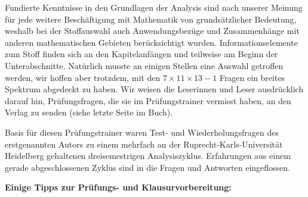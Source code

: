 Fundierte Kenntnisse in den Grundlagen der Analysis sind nach unserer 
Meinung für jede weitere Beschäftigung mit Mathematik von grundsätzlicher 
Bedeutung, weshalb bei der Stoffauswahl auch Anwendungsbezüge und 
Zusammenhänge mit anderen mathematischen Gebieten berücksichtigt wurden.
Informationselemente zum Stoff finden sich an den Kapitelanfängen und 
teilweise am Beginn der Unterabschnitte. 
Natürlich musste an einigen Stellen eine Auswahl 
getroffen werden, wir hoffen aber trotzdem, mit den 
$7 \times 11 \times 13-1$ Fragen ein breites Spektrum 
abgedeckt zu haben. Wir weisen die \mbox{Leserinnen} und Leser ausdrücklich 
darauf hin, Prüfungsfragen, die sie im Prüfungstrainer vermisst haben, an den 
Verlag zu senden (siehe letzte Seite im Buch).

Basis für diesen Prüfungstrainer waren Test- und Wiederholungsfragen des 
erstgenannten Autors zu einem mehrfach an der Ruprecht-Karls-Universität 
Heidelberg  gehaltenen dreisemestrigen Analysiszyklus. Erfahrungen aus einem 
gerade abgeschlossenen Zyklus sind in die Fragen und Antworten 
eingeflossen.

\bigskip
\noindent%
\textbf{Einige Tipps zur Prüfungs- und Klausurvorbereitung:}

